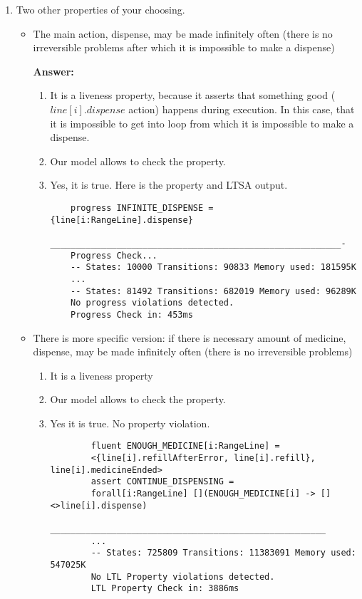 \documentclass{article}
\begin{document}
\begin{enumerate}
    \item Two other properties of your choosing.
    
    \begin{itemize}
    \item The main action, dispense, may be made infinitely often (there is no irreversible problems after which it is
    impossible to make a dispense)
    
    \textbf{Answer:}
    \begin{enumerate}
    	\item It is a liveness property, because it asserts that something good ($line[i].dispense$ action) happens during execution. In this case, that it is
    	impossible to get into loop from which it is impossible to make a dispense.
    	\item Our model allows to check the property. 
    	\item Yes, it is true. Here is the property and LTSA output.
    	\begin{verbatim}   
    progress INFINITE_DISPENSE = {line[i:RangeLine].dispense}	
    _________________________________________________________- 	
    Progress Check...
    -- States: 10000 Transitions: 90833 Memory used: 181595K
    ...
    -- States: 81492 Transitions: 682019 Memory used: 96289K
    No progress violations detected.
    Progress Check in: 453ms
    	 \end{verbatim}
    	 \end{enumerate}
    	 
    	 \item There is more specific version: if there is necessary amount of medicine, dispense, may be made infinitely
    	 often (there is no irreversible problems)
    	 \begin{enumerate}
    	 	\item It is a liveness property
    	 \item Our model allows to check the property.
    	 \item Yes it is true. No property violation.
    	 \begin{verbatim}
    	fluent ENOUGH_MEDICINE[i:RangeLine] =
    	<{line[i].refillAfterError, line[i].refill}, line[i].medicineEnded>
    	assert CONTINUE_DISPENSING =
    	forall[i:RangeLine] [](ENOUGH_MEDICINE[i] -> [] <>line[i].dispense)
    	______________________________________________________
    	...
    	-- States: 725809 Transitions: 11383091 Memory used: 547025K
    	No LTL Property violations detected.
    	LTL Property Check in: 3886ms
    	

\end{verbatim}
\end{enumerate}
\end{itemize}
\end{enumerate}
\end{document}
